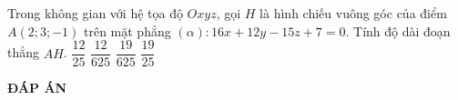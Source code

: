 \begin{ex}%
Trong không gian với hệ tọa độ $Oxyz$, gọi $H$ là hình chiếu vuông góc của điểm $A(2;3;-1)$ trên mặt phẳng $(\alpha)\colon 16x+12y-15z+7=0$. Tính độ dài đoạn thẳng $AH$.
\choice
{\True $\dfrac{12}{25}$}
{$\dfrac{12}{625}$}
{$\dfrac{19}{625}$}
{$\dfrac{19}{25}$}
\end{ex}
\newpage
\begin{center}
	\textbf{ĐÁP ÁN}
\end{center}
\begin{multicols}{10}
	 
\end{multicols}
